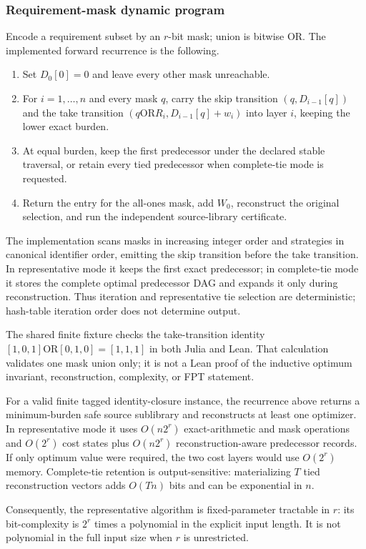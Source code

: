 \subsubsection{Requirement-mask dynamic program}
Encode a requirement subset by an $r$-bit mask; union is bitwise OR.  The
implemented forward recurrence is the following.

\begin{enumerate}
\item Set $D_0[0]=0$ and leave every other mask unreachable.
\item For $i=1,\ldots,n$ and every mask $q$, carry the skip transition
      $(q,D_{i-1}[q])$ and the take transition
      $(q\mathbin{\mathrm{OR}}R_i,D_{i-1}[q]+w_i)$ into layer $i$, keeping
      the lower exact burden.
\item At equal burden, keep the first predecessor under the declared stable
      traversal, or retain every tied predecessor when complete-tie mode is
      requested.
\item Return the entry for the all-ones mask, add $W_0$, reconstruct the
      original selection, and run the independent source-library certificate.
\end{enumerate}

The implementation scans masks in increasing integer order and strategies in
canonical identifier order, emitting the skip transition before the take
transition.  In representative mode it keeps the first exact predecessor; in
complete-tie mode it stores the complete optimal predecessor DAG and expands
it only during reconstruction.  Thus iteration and representative tie
selection are deterministic; hash-table iteration order does not determine
output.

The shared finite fixture checks the take-transition identity
\([1,0,1]\mathbin{\mathrm{OR}}[0,1,0]=[1,1,1]\) in both Julia and Lean.
That calculation validates one mask union only; it is not a Lean proof of the
inductive optimum invariant, reconstruction, complexity, or FPT statement.

\begin{theorem}
\label{thm:aor-requirement-mask-dp}
For a valid finite tagged identity-closure instance, the recurrence above
returns a minimum-burden safe source sublibrary and reconstructs at least one
optimizer.  In representative mode it uses $O(n2^r)$ exact-arithmetic and mask
operations and $O(2^r)$ cost states plus $O(n2^r)$ reconstruction-aware
predecessor records.  If only optimum value were required, the two cost layers
would use $O(2^r)$ memory.  Complete-tie retention is output-sensitive:
materializing $T$ tied reconstruction vectors adds $O(Tn)$ bits and can be
exponential in $n$.

Consequently, the representative algorithm is fixed-parameter tractable in
$r$: its bit-complexity is $2^r$ times a polynomial in the explicit input
length.  It is not polynomial in the full input size when $r$ is unrestricted.
\end{theorem}

